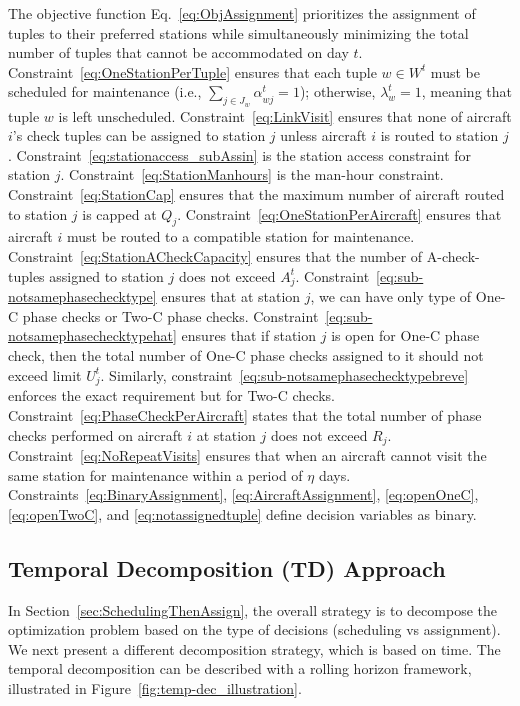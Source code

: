 The objective function Eq.~\eqref{eq:ObjAssignment} prioritizes the assignment of tuples to their preferred stations while simultaneously minimizing the total number of tuples that cannot be accommodated on day $t$.
Constraint~\eqref{eq:OneStationPerTuple} ensures that each tuple $w \in W^t$ must be scheduled for maintenance (i.e., $\sum_{j \in J_w} \alpha_{wj}^t = 1$); otherwise, $\lambda_{w}^t = 1$, meaning that tuple $w$ is left unscheduled.  
Constraint~\eqref{eq:LinkVisit} ensures that none of aircraft $i$'s check tuples can be assigned to station $j$ unless aircraft $i$ is routed to station $j$.
Constraint~\eqref{eq:stationaccess_subAssin} is the station access constraint for station $j$.
Constraint~\eqref{eq:StationManhours} is the man-hour constraint.
Constraint~\eqref{eq:StationCap} ensures that the maximum number of aircraft routed to station $j$ is capped at $Q_j$.
Constraint~\eqref{eq:OneStationPerAircraft} ensures that aircraft $i$ must be routed to a compatible station for maintenance.
Constraint~\eqref{eq:StationACheckCapacity} ensures that the number of A-check-tuples assigned to station $j$ does not exceed $A_j^t$. 
Constraint~\eqref{eq:sub-notsamephasechecktype} ensures that at station $j$, we can have only type of One-C phase checks or Two-C phase checks.
Constraint~\eqref{eq:sub-notsamephasechecktypehat} ensures that if station $j$ is open for One-C phase check, then the total number of One-C phase checks assigned to it should not exceed limit $U_j^t$.
Similarly, constraint~\eqref{eq:sub-notsamephasechecktypebreve} enforces the exact requirement but for Two-C checks. 
Constraint~\eqref{eq:PhaseCheckPerAircraft} states that the total number of phase checks performed on aircraft $i$ at station $j$ does not exceed $R_j$.
Constraint~\eqref{eq:NoRepeatVisits} ensures that when an aircraft cannot visit the same station for maintenance within a period of $\eta$ days.
Constraints~\eqref{eq:BinaryAssignment}, \eqref{eq:AircraftAssignment}, \eqref{eq:openOneC},  \eqref{eq:openTwoC}, and \eqref{eq:notassignedtuple} define decision variables as binary.



\subsection{Temporal Decomposition (TD) Approach}
\label{sec:tempDecomp}
In Section~\ref{sec:SchedulingThenAssign}, the overall strategy is to decompose the optimization problem based on the type of decisions (scheduling vs assignment). We next present a different decomposition strategy, which is based on time. The temporal decomposition can be described with a rolling horizon framework, illustrated in Figure~\ref{fig:temp-dec_illustration}. 

